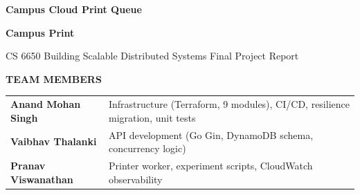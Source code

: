 \documentclass[11pt,letterpaper]{article}
\begin{document}
\begin{titlepage}
\thispagestyle{empty}
\noindent
{}

\vspace*{0.9cm}
{\color{white}\fontsize{28}{34}\selectfont\bfseries Campus Cloud Print Queue\par}
\vspace{0.25cm}
{\color{accent!70!white}\fontsize{13}{20}\selectfont
  \textbf{Campus Print} \par}
\vspace{0.15cm}
{\color{white!75!primary}\normalsize
  CS 6650  \textperiodcentered{}
  Building Scalable Distributed Systems \textperiodcentered{}
  Final Project Report\par}

\vspace{1.6cm}

\begin{tcolorbox}[
  colback=surface,
  colframe=border,
  boxrule=0.8pt,
  arc=4pt,
  width=1.0\textwidth,
  left=14pt, right=14pt, top=10pt, bottom=10pt,
]
  {\small\bfseries\color{muted}\MakeUppercase{Team Members}\par}
  \vspace{6pt}
  \begin{tabularx}{\linewidth}{@{}lX@{}}
    \textbf{Anand Mohan Singh}    & Infrastructure (Terraform, 9 modules), CI/CD, resilience migration, unit tests \\[3pt]
    \textbf{Vaibhav Thalanki}     & API development (Go Gin, DynamoDB schema, concurrency logic) \\[3pt]
    \textbf{Pranav Viswanathan}   & Printer worker, experiment scripts, CloudWatch observability \\
  \end{tabularx}
\end{tcolorbox}

\vspace{0.8cm}


\end{titlepage}
\end{document}
